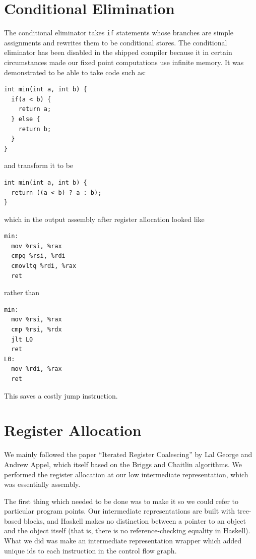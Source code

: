 \documentclass[11pt]{article}
\begin{document}

\section {Conditional Elimination} 

The conditional eliminator takes \texttt{if} statements whose branches
are simple assignments and rewrites them to be conditional stores.
The conditional eliminator has been disabled in the shipped compiler
because it in certain circumstances made our fixed point computations
use infinite memory.  It was demonstrated to be able to take code such
as:
\begin{verbatim}
int min(int a, int b) {
  if(a < b) {
    return a;
  } else {
    return b;
  }
}
\end{verbatim}
and transform it to be
\begin{verbatim}
int min(int a, int b) {
  return ((a < b) ? a : b);
}
\end{verbatim}
which in the output assembly after register allocation looked like
\begin{verbatim}
min:
  mov %rsi, %rax
  cmpq %rsi, %rdi
  cmovltq %rdi, %rax
  ret
\end{verbatim}
rather than
\begin{verbatim}
min:
  mov %rsi, %rax
  cmp %rsi, %rdx
  jlt L0
  ret
L0:
  mov %rdi, %rax
  ret
\end{verbatim}

This saves a costly jump instruction.

\section {Register Allocation}

We mainly followed the paper ``Iterated Register Coalescing'' by Lal
George and Andrew Appel, which itself based on the Briggs and Chaitlin
algorithms.  We performed the register allocation at our low
intermediate representation, which was essentially assembly.

The first thing which needed to be done was to make it so we could
refer to particular program points.  Our intermediate representations
are built with tree-based blocks, and Haskell makes no distinction
between a pointer to an object and the object itself (that is, there
is no reference-checking equality in Haskell).  What we did was make
an intermediate representation wrapper which added unique ids to each
instruction in the control flow graph.
\end{document}
